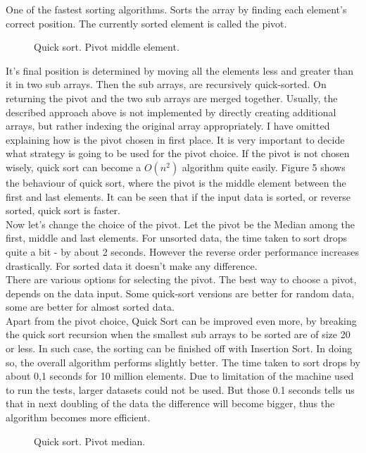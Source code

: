 \documentclass{acm_proc_article-sp}
\begin{document}
One of the fastest sorting algorithms. Sorts the array by finding each element's correct position. The currently sorted element is called the pivot.
 \begin{figure}[!h]
\caption{Quick sort. Pivot middle element.}
\end{figure}
 It's final position is determined by moving all the elements less and greater than it in two sub arrays. Then the sub arrays, are recursively quick-sorted. On returning the pivot and the two sub arrays are merged together. Usually, the described approach above is not implemented by directly creating additional arrays, but rather indexing the original array appropriately.
I have omitted explaining how is the pivot chosen in first place. It is very important to decide what strategy is going to be used for the pivot choice. If the pivot is not chosen wisely, quick sort can become a $O(n^2)$ algorithm quite easily. Figure 5 shows the behaviour of quick sort, where the pivot is the middle element between the first and last elements. It can be seen that if the input data is sorted, or reverse sorted, quick sort is faster.\\
Now let's change the choice of the pivot. Let the pivot be the Median among the first, middle and last elements.
For unsorted data, the time taken to sort drops quite a bit - by about 2 seconds. However the reverse order performance increases drastically. For sorted data it doesn't make any difference.\\
There are various options for selecting the pivot. The best way to choose a pivot, depends on the data input. Some quick-sort versions are better for random data, some are better for almost sorted data.\\
Apart from the pivot choice, Quick Sort can be improved even more, by breaking the quick sort recursion when the smallest sub arrays to be sorted are of size 20 or less. In such case, the sorting can be finished off with Insertion Sort. In doing so, the overall algorithm performs slightly better. The time taken to sort drops by about 0,1 seconds for 10 million elements. Due to limitation of the machine used to run the tests, larger datasets could not be used. But those 0.1 seconds tells us that in next doubling of the data the difference will become bigger, thus the algorithm becomes more efficient.\\
\begin{figure}[!htb]
\caption{Quick sort. Pivot median.}
\end{figure}
\end{document}
